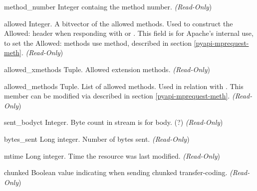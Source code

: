\begin{memberdesc}[request]{method_number}
Integer containg the method number.
\emph{(Read-Only})
\end{memberdesc}

\begin{memberdesc}[request]{allowed}
Integer. A bitvector of the allowed methods. Used to construct the
Allowed: header when responding with
 or
. This field is for Apache's internal
use, to set the Allowed: methods use 
method, described in section \ref{pyapi-mprequest-meth}. 
\emph{(Read-Only})
\end{memberdesc}

\begin{memberdesc}[request]{allowed_xmethods}
Tuple. Allowed extension methods.
\emph{(Read-Only})
\end{memberdesc}

\begin{memberdesc}[request]{allowed_methods}
Tuple. List of allowed methods. Used in relation with
. This member can be modified via  
described in section \ref{pyapi-mprequest-meth}.
\emph{(Read-Only})
\end{memberdesc}

\begin{memberdesc}[request]{sent_bodyct}
Integer. Byte count in stream is for body. (?)
\emph{(Read-Only})
\end{memberdesc}

\begin{memberdesc}[request]{bytes_sent}
Long integer. Number of bytes sent.
\emph{(Read-Only})
\end{memberdesc}

\begin{memberdesc}[request]{mtime}
Long integer. Time the resource was last modified.
\emph{(Read-Only})
\end{memberdesc}

\begin{memberdesc}[request]{chunked}
Boolean value indicating when sending chunked transfer-coding.
\emph{(Read-Only})
\end{memberdesc}


